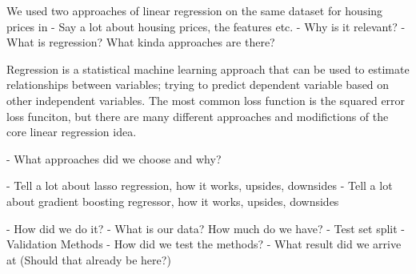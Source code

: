 We used two approaches of linear regression on the same dataset for housing prices in 
 - Say a lot about housing prices, the features etc.
 - Why is it relevant?
 - What is regression? What kinda approaches are there?

Regression is a statistical machine learning approach that can be used to estimate relationships between variables; trying to predict dependent variable based on other independent variables. The most common loss function is the squared error loss funciton, but there are many different approaches and modifictions of the core linear regression idea.

 - What approaches did we choose and why?

   - Tell a lot about lasso regression, how it works, upsides, downsides
   - Tell a lot about gradient boosting regressor, how it works, upsides, downsides

 - How did we do it?
 - What is our data? How much do we have?
 - Test set split
 - Validation Methods
 - How did we test the methods?
 - What result did we arrive at (Should that already be here?)
